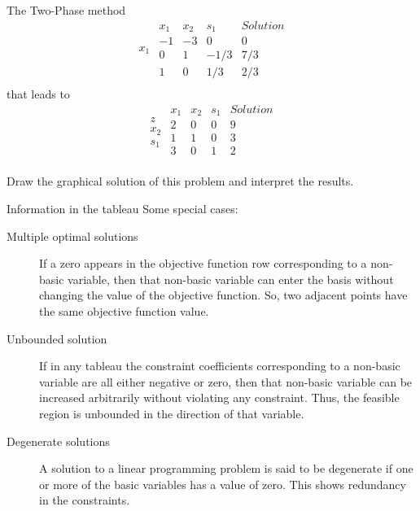 \documentclass[c]{beamer}
\begin{document}
\begin{frame}[allowframebreaks]{The Two-Phase method}
\begin{equation*}
\begin{array}{c}
        x_1\\
      \end{array}
      \begin{array}{ccc|c}
        x_1 & x_2 & s_1 &  Solution \\ \hline
        -1 & -3 & 0 &  0 \\ \hline
        0 & 1 & -1/3 & 7/3  \\
        1 & 0 & 1/3  & 2/3 \\
      \end{array}
    \end{equation*}
    that leads to
    \begin{equation*}
      \begin{array}{c}
        \\
        z\\
        x_2\\
        s_1\\
      \end{array}
      \begin{array}{ccc|c}
        x_1 & x_2 & s_1 &  Solution \\ \hline
        2 & 0 & 0 &  9 \\ \hline
        1 & 1 & 0 & 3  \\
        3 & 0 & 1  & 2 \\
      \end{array}
    \end{equation*}

      Draw the graphical solution of this problem and interpret the results.

  \end{frame}

  \begin{frame}{Information in the tableau}
    Some special cases:
    \begin{description}
      \item[Multiple optimal solutions] If a zero appears in the objective function row corresponding to a non-basic
      variable, then that non-basic variable can enter the basis without changing the value of
      the objective function. So, two adjacent points have the same objective function value.
      \item[Unbounded solution] If in any tableau the constraint coefficients corresponding to a non-basic variable are all
      either negative or zero, then that non-basic variable can be increased arbitrarily without
      violating any constraint. Thus, the feasible region is unbounded in the direction of that
      variable.
      \item[Degenerate solutions] A solution to a linear programming problem is said to be degenerate if one or more of the
      basic variables has a value of zero. This shows redundancy in the constraints.
    \end{description}
  \end{frame}
\end{document}
